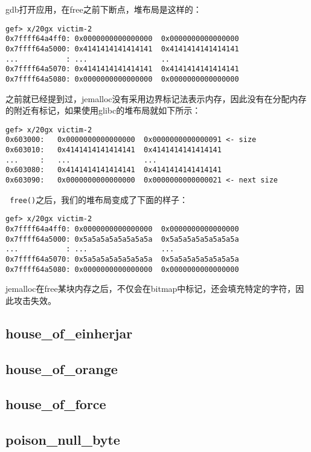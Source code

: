 gdb打开应用，在free之前下断点，堆布局是这样的：
\begin{verbatim}
gef> x/20gx victim-2
0x7ffff64a4ff0: 0x0000000000000000  0x0000000000000000
0x7ffff64a5000: 0x4141414141414141  0x4141414141414141
...           : ...                 ..
0x7ffff64a5070: 0x4141414141414141  0x4141414141414141
0x7ffff64a5080: 0x0000000000000000  0x0000000000000000
\end{verbatim}

之前就已经提到过，jemalloc没有采用边界标记法表示内存，因此没有在分配内存的附近有标记，如果使用glibc的堆布局就如下所示：
\begin{verbatim}
gef> x/20gx victim-2
0x603000:   0x0000000000000000  0x0000000000000091 <- size
0x603010:   0x4141414141414141  0x4141414141414141
...     :   ...                 ...
0x603080:   0x4141414141414141  0x4141414141414141
0x603090:   0x0000000000000000  0x0000000000000021 <- next size
\end{verbatim}

\verb+ free()+之后，我们的堆布局变成了下面的样子：
\begin{verbatim}
gef> x/20gx victim-2
0x7ffff64a4ff0: 0x0000000000000000  0x0000000000000000
0x7ffff64a5000: 0x5a5a5a5a5a5a5a5a  0x5a5a5a5a5a5a5a5a
...           : ...                 ...
0x7ffff64a5070: 0x5a5a5a5a5a5a5a5a  0x5a5a5a5a5a5a5a5a
0x7ffff64a5080: 0x0000000000000000  0x0000000000000000
\end{verbatim}

jemalloc在free某块内存之后，不仅会在bitmap中标记，还会填充特定的字符，因此攻击失效。

\subsection{house\_of\_einherjar}

\subsection{house\_of\_orange}

\subsection{house\_of\_force}

\subsection{poison\_null\_byte}

